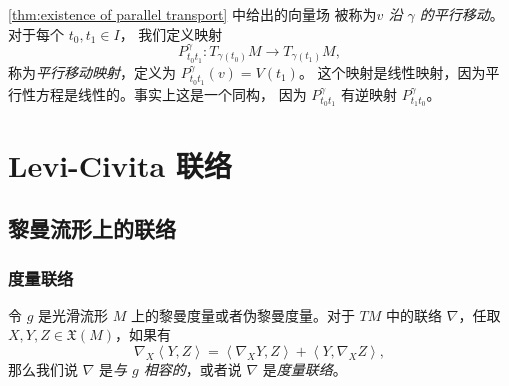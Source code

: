 \documentclass[fontset=none]{Notes}
\newcommand{\inn}[1]{\left\langle #1\right\rangle}
\begin{document}
\autoref{thm:existence of parallel transport} 中给出的向量场
被称为\emph{$v$ 沿 $\gamma$ 的平行移动}。对于每个 $t_0,t_1\in I$，
我们定义映射
\begin{equation}
  P_{t_0t_1}^\gamma:T_{\gamma(t_0)}M\to T_{\gamma(t_1)}M,
\end{equation}
称为\emph{平行移动映射}，定义为 $P_{t_0t_1}^\gamma(v)=V(t_1)$。
这个映射是线性映射，因为平行性方程是线性的。事实上这是一个同构，
因为 $P_{t_0t_1}^\gamma$ 有逆映射 $P_{t_1t_0}^\gamma$。


\chapter{Levi-Civita 联络}

\section{黎曼流形上的联络}

\subsection{度量联络}

令 $g$ 是光滑流形 $M$ 上的黎曼度量或者伪黎曼度量。对于 $TM$ 中的联络
$\nabla$，任取 $X,Y,Z\in \mathfrak{X}(M)$，如果有
\begin{equation}
  \nabla_X\inn{Y,Z}=\inn{\nabla_XY,Z}+\inn{Y,\nabla_XZ},
\end{equation}
那么我们说 $\nabla$ 是\emph{与 $g$ 相容的}，或者说 $\nabla$ 是\emph{度量联络}。
\end{document}
